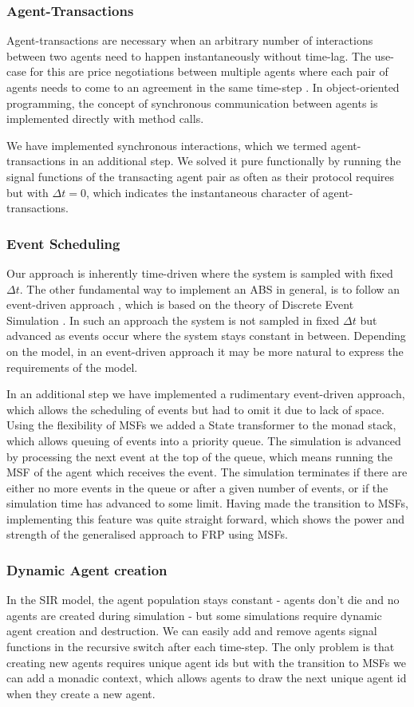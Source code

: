 \subsubsection{Agent-Transactions}
Agent-transactions are necessary when an arbitrary number of interactions between two agents need to happen instantaneously without time-lag. The use-case for this are price negotiations between multiple agents where each pair of agents needs to come to an agreement in the same time-step \cite{epstein_growing_1996}. In object-oriented programming, the concept of synchronous communication between agents is implemented directly with method calls.

We have implemented synchronous interactions, which we termed agent-transactions in an additional step. We solved it pure functionally by running the signal functions of the transacting agent pair as often as their protocol requires but with $\Delta t=0$, which indicates the instantaneous character of agent-transactions.

\subsubsection{Event Scheduling}
Our approach is inherently time-driven where the system is sampled with fixed $\Delta t$. The other fundamental way to implement an ABS in general, is to follow an event-driven approach \cite{meyer_event-driven_2014}, which is based on the theory of Discrete Event Simulation \cite{zeigler_theory_2000}. In such an approach the system is not sampled in fixed $\Delta t$ but advanced as events occur where the system stays constant in between. Depending on the model, in an event-driven approach it may be more natural to express the requirements of the model.

In an additional step we have implemented a rudimentary event-driven approach, which allows the scheduling of events but had to omit it due to lack of space. Using the flexibility of MSFs we added a State transformer to the monad stack, which allows queuing of events into a priority queue. The simulation is advanced by processing the next event at the top of the queue, which means running the MSF of the agent which receives the event. The simulation terminates if there are either no more events in the queue or after a given number of events, or if the simulation time has advanced to some limit. Having made the transition to MSFs, implementing this feature was quite straight forward, which shows the power and strength of the generalised approach to FRP using MSFs.

\subsubsection{Dynamic Agent creation}
In the SIR model, the agent population stays constant - agents don't die and no agents are created during simulation - but some simulations \cite{epstein_growing_1996} require dynamic agent creation and destruction. We can easily add and remove agents signal functions in the recursive switch after each time-step. The only problem is that creating new agents requires unique agent ids but with the transition to MSFs we can add a monadic context, which allows agents to draw the next unique agent id when they create a new agent. 